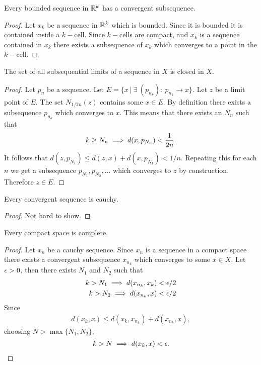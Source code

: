 \begin{theorem}
  Every bounded sequence in $\mathbb{R}^k$ has a convergent subsequence.
\end{theorem}
\begin{proof}
  Let $x_k$ be a sequence in $\mathbb{R}^k$ which is bounded. Since it is bounded it is contained inside a $k-$cell. Since $k-$cells are compact, and $x_k$ is a sequence contained in $x_k$ there exists a subsequence of $x_k$ which converges to a point in the $k-$cell.
\end{proof}
\begin{theorem}
  The set of all subsequential limits of a sequence in $X$ is closed in $X$.
\end{theorem}
\begin{proof}
  Let $p_n$ be a sequence. Let $E = \{x\ |\ \exists\ (p_{n_k}):\ p_{n_k} \to x\}$. Let $z$ be a limit point of $E$. The set $N_{1/2n}(z)$ contains some $x\in E$. By definition there exists a subsequence $p_{n_k}$ which converges to $x$. This means that there exists an $N_n$ such that
  \begin{align*}
    k\geq N_n \implies d(x,p_{N_n}) < \frac{1}{2n}.
  \end{align*}
  It follows that $d(z,p_{N_1}) \leq d(z,x) + d(x,p_{N_1}) < 1/n$. Repeating this for each $n$ we get a subsequence $p_{N_1},p_{N_2},...$ which converges to $z$ by construction. Therefore $z\in E$. 
\end{proof}
\begin{proposition}
  Every convergent sequence is cauchy.
\end{proposition}
\begin{proof}
  Not hard to show.
\end{proof}
\begin{proposition}
  Every compact space is complete.
\end{proposition}
\begin{proof}
  Let $x_n$ be a cauchy sequence. Since $x_n$ is a sequence in a compact space there exists a convergent subsequence $x_{n_k}$ which converges to some $x\in X$. Let $\epsilon>0$, then there exists $N_1$ and $N_2$ such that
  \begin{align*}
    k> N_1 \implies d(x_{n_k}, x_k) < \epsilon/2\\
    k> N_2 \implies d(x_{n_k}, x) < \epsilon/2\\
  \end{align*}
  Since
  \begin{align*}
    d(x_k,x) \leq d(x_k, x_{n_k}) + d(x_{n_k}, x),
  \end{align*}
  choosing $N> \max\{N_1, N_2\}$,
  \begin{align*}
    k>N \implies d(x_k,x)<\epsilon.
  \end{align*}
\end{proof}
